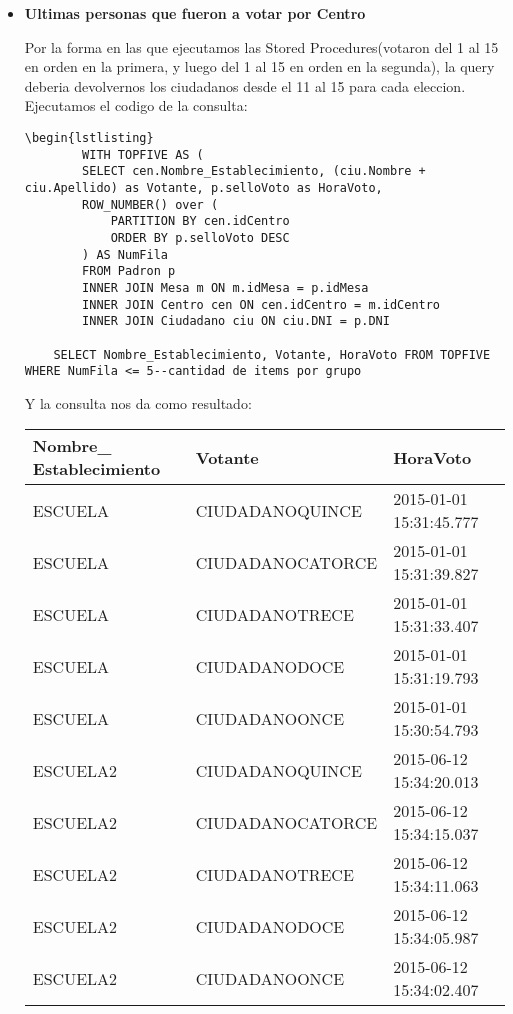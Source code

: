 \begin{itemize}
\item \textbf{Ultimas personas que fueron a votar por Centro}

Por la forma en las que ejecutamos las Stored Procedures(votaron del 1 al 15 en orden en la primera, y luego del 1 al 15 en orden en la segunda), la query deberia devolvernos los ciudadanos desde el 11 al 15 para cada eleccion. Ejecutamos el codigo de la consulta:

\begin{lstlisting}
\begin{lstlisting}
		WITH TOPFIVE AS (
	    SELECT cen.Nombre_Establecimiento, (ciu.Nombre + ciu.Apellido) as Votante, p.selloVoto as HoraVoto,
	    ROW_NUMBER() over (
	        PARTITION BY cen.idCentro
	        ORDER BY p.selloVoto DESC
	    ) AS NumFila
	    FROM Padron p
	    INNER JOIN Mesa m ON m.idMesa = p.idMesa
	    INNER JOIN Centro cen ON cen.idCentro = m.idCentro
	    INNER JOIN Ciudadano ciu ON ciu.DNI = p.DNI
	    
	SELECT Nombre_Establecimiento, Votante, HoraVoto FROM TOPFIVE WHERE NumFila <= 5--cantidad de items por grupo
	\end{lstlisting}

Y la consulta nos da como resultado:


 \begin{tabular}{| l| l| l|}
	\hline 
	    Nombre\_ Establecimiento & Votante & HoraVoto \\
	  \hline 
	   ESCUELA &CIUDADANOQUINCE & 2015-01-01 15:31:45.777 \\
	   \hline 
	   ESCUELA &CIUDADANOCATORCE & 2015-01-01 15:31:39.827 \\
	   \hline 
	   ESCUELA &CIUDADANOTRECE & 2015-01-01 15:31:33.407 \\
	   \hline 
	  ESCUELA  & CIUDADANODOCE & 2015-01-01 15:31:19.793\\
	   \hline 
	   ESCUELA  & CIUDADANOONCE & 2015-01-01 15:30:54.793\\
	   \hline 
	   ESCUELA2 &CIUDADANOQUINCE & 2015-06-12 15:34:20.013 \\
	   \hline 
	   ESCUELA2 &CIUDADANOCATORCE & 2015-06-12 15:34:15.037 \\
	   \hline 
	   ESCUELA2  & CIUDADANOTRECE &2015-06-12 15:34:11.063 \\
	   \hline 
	   ESCUELA2  & CIUDADANODOCE &2015-06-12 15:34:05.987 \\
	   \hline 
	   ESCUELA2  & CIUDADANOONCE &2015-06-12 15:34:02.407 \\
	   \hline 
	\end{tabular}

\end{itemize}